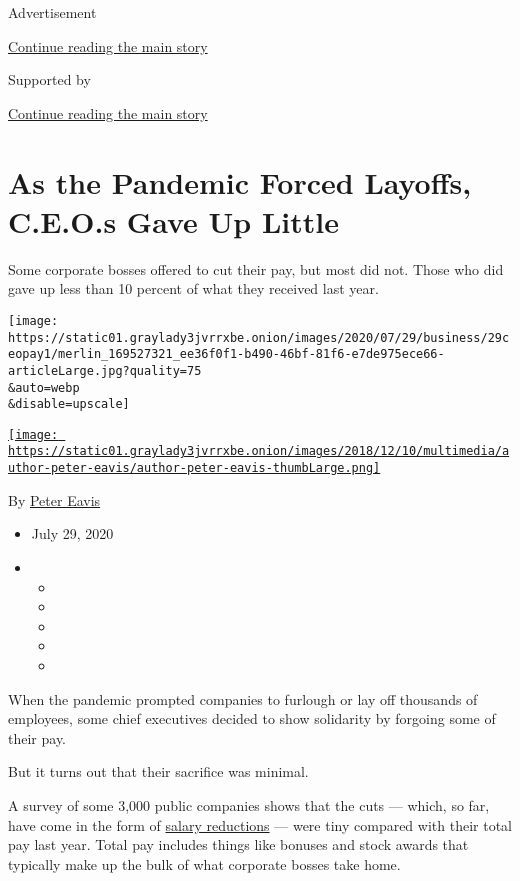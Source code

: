 Advertisement

\protect\hyperlink{after-top}{Continue reading the main story}

Supported by

\protect\hyperlink{after-sponsor}{Continue reading the main story}

\hypertarget{as-the-pandemic-forced-layoffs-ceos-gave-up-little}{%
\section{As the Pandemic Forced Layoffs, C.E.O.s Gave Up
Little}\label{as-the-pandemic-forced-layoffs-ceos-gave-up-little}}

Some corporate bosses offered to cut their pay, but most did not. Those
who did gave up less than 10 percent of what they received last year.

\texttt{[image: https://static01.graylady3jvrrxbe.onion/images/2020/07/29/business/29ceopay1/merlin\_169527321\_ee36f0f1-b490-46bf-81f6-e7de975ece66-articleLarge.jpg?quality=75\\\&auto=webp\\\&disable=upscale]}

\href{https://www.nytimes3xbfgragh.onion/by/peter-eavis}{\texttt{[image: https://static01.graylady3jvrrxbe.onion/images/2018/12/10/multimedia/author-peter-eavis/author-peter-eavis-thumbLarge.png]}}

By \href{https://www.nytimes3xbfgragh.onion/by/peter-eavis}{Peter Eavis}

\begin{itemize}
\item
  July 29, 2020
\item
  \begin{itemize}
  \item
  \item
  \item
  \item
  \item
  \end{itemize}
\end{itemize}

When the pandemic prompted companies to furlough or lay off thousands of
employees, some chief executives decided to show solidarity by forgoing
some of their pay.

But it turns out that their sacrifice was minimal.

A survey of some 3,000 public companies shows that the cuts --- which,
so far, have come in the form of
\href{https://www.nytimes3xbfgragh.onion/2020/05/24/business/economy/coronavirus-pay-cuts.html}{salary
reductions} --- were tiny compared with their total pay last year. Total
pay includes things like bonuses and stock awards that typically make up
the bulk of what corporate bosses take home.

